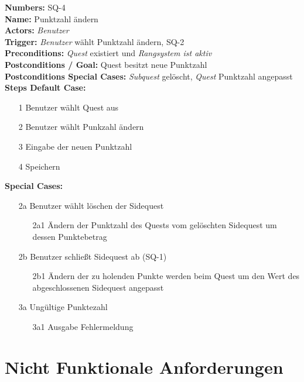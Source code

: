 \documentclass{article}
\begin{document}
\newpage

	\begin{samepage}
		\textbf{Numbers:} SQ-4 \\
		\textbf{Name:} Punktzahl ändern\\
		\textbf{Actors:} \textit{Benutzer}\\
		\textbf{Trigger:} \textit{Benutzer} wählt Punktzahl ändern, SQ-2\\ 
		\textbf{Preconditions:} \textit{Quest} existiert und \textit{Rangsystem ist aktiv}\\ 
		\textbf{Postconditions / Goal:} Quest besitzt neue Punktzahl\\
		\textbf{Postconditions Special Cases:} \textit{Subquest} gelöscht, \textit{Quest} Punktzahl angepasst\\
		\textbf{Steps Default Case:}
		\begin{itemize}
			\item[1] Benutzer wählt Quest aus
			\item[2] Benutzer wählt Punkzahl ändern
			\item[3] Eingabe der neuen Punktzahl 
			\item[4] Speichern   
		\end{itemize}
		\textbf{Special Cases:}
		\begin{itemize}
		\item [2a] Benutzer wählt löschen der Sidequest
		\begin{itemize}
			\item [2a1] Ändern der Punktzahl des Quests vom gelöschten Sidequest um dessen Punktebetrag
		\end{itemize}   
		\item [2b] Benutzer schließt Sidequest ab (SQ-1)
		\begin{itemize}
			\item [2b1] Ändern der zu holenden Punkte werden beim Quest um den Wert des abgeschlossenen Sidequest angepasst
		\end{itemize}
		\item [3a] Ungültige Punktezahl 
		\begin{itemize}
			\item [3a1] Ausgabe Fehlermeldung
		\end{itemize}
		\end{itemize} 
		\end{samepage}

\newpage
\section{Nicht Funktionale Anforderungen}
\end{document}
